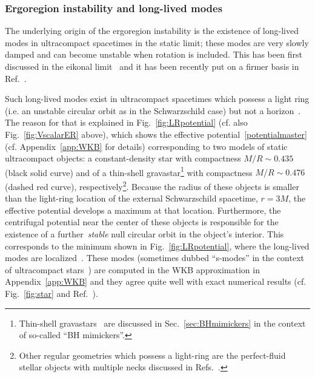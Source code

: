 \documentclass[11pt]{article}
\numberwithin{equation}{section} %
\begin{document}
\subsubsection{Ergoregion instability and long-lived modes} \label{sec:ERlonglived}


The underlying origin of the ergoregion instability is the existence of long-lived modes in ultracompact spacetimes in the static limit; these modes are very slowly damped and can become unstable when rotation is included. This has been first discussed in the eikonal limit~\cite{CominsSchutz} and it has been recently put on a firmer basis in Ref.~\cite{Cardoso:2014sna}.


Such long-lived modes exist in ultracompact spacetimes which possess a light ring (i.e. an unstable circular orbit as in the Schwarzschild case) but not a horizon~\cite{Cardoso:2014sna,Keir:2014oka}.
The reason for that is explained in Fig.~\ref{fig:LRpotential} (cf. also Fig.~\ref{fig:VscalarER} above), which shows the effective potential~\eqref{potentialmaster} (cf. Appendix~\ref{app:WKB} for details) corresponding to two models of static ultracompact objects: a constant-density star with compactness $M/R\sim0.435$ (black solid curve) and of a thin-shell gravastar\footnote{Thin-shell gravastars~\cite{Mazur:2001fv} are discussed in Sec.~\ref{sec:BHmimickers} in the context of so-called ``BH mimickers''.} with compactness $M/R\sim 0.476$ (dashed red curve), respectively\footnote{Other regular geometries which possess a light-ring are the perfect-fluid stellar objects with multiple necks discussed in Refs.~\cite{Karlovini:2000zu,Karlovini:2000xd,Karlovini:2000rn}.}. 
%
Because the radius of these objects is smaller than the light-ring location of the external Schwarzschild spacetime, $r=3M$, the effective potential develops a maximum at that location. Furthermore, the centrifugal potential near the center of these objects is responsible for the existence of a further~\emph{stable} null circular orbit in the object's interior. This corresponds to the minimum shown in Fig.~\ref{fig:LRpotential}, where the long-lived modes are localized~\cite{Cardoso:2014sna}. These modes (sometimes dubbed ``s-modes'' in the context of ultracompact stars~\cite{ChandraFerrari91}) are computed in the WKB approximation in Appendix~\ref{app:WKB} and they agree quite well with exact numerical results (cf. Fig.~\ref{fig:star} and Ref.~\cite{Cardoso:2014sna}).
\end{document}
